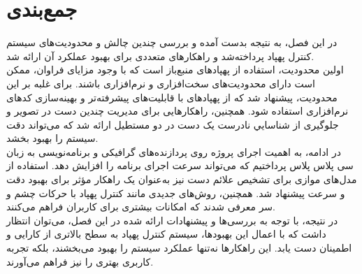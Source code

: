 \section{جمع‌بندی}
در این فصل، به نتیجه‌ بدست آمده و بررسی چندین چالش‌ و محدودیت‌های سیستم کنترل پهپاد پرداخته‌شد و راهکارهای متعددی برای بهبود عملکرد آن ارائه شد. 
\\
اولین محدودیت، استفاده از پهپادهای منبع‌باز است که با وجود مزایای فراوان، ممکن است دارای محدودیت‌های سخت‌افزاری و نرم‌افزاری باشند. برای غلبه بر این محدودیت، پیشنهاد شد که از پهپادهای با قابلیت‌های پیشرفته‌تر و 
بهینه‌سازی کدهای نرم‌افزاری استفاده شود. همچنین، راهکارهایی برای مدیریت چندین دست در تصویر و جلوگیری از شناسايي نادرست یک دست در دو مستطیل ارائه شد که می‌تواند دقت سیستم را بهبود بخشد.
\\
در ادامه، به اهمیت اجرای پروژه روی پردازنده‌های گرافیکی و برنامه‌نویسی به زبان سی پلاس پلاس پرداختیم که می‌تواند سرعت اجرای برنامه را افزایش دهد. استفاده از مدل‌های موازی برای تشخیص علائم دست نیز به‌عنوان یک راهکار مؤثر برای بهبود 
دقت و سرعت پیشنهاد شد. همچنین، روش‌های جدیدی مانند کنترل پهپاد با حرکات چشم و سر معرفی شدند که امکانات بیشتری برای کاربران فراهم می‌کنند.
\\
در نتیجه، با توجه به بررسی‌ها و پیشنهادات ارائه شده در این فصل، می‌توان انتظار داشت که با اعمال این بهبودها، سیستم کنترل پهپاد به سطح بالاتری از کارایی و اطمینان دست یابد. این راهکارها نه‌تنها عملکرد سیستم را بهبود می‌بخشند، بلکه تجربه کاربری بهتری را نیز فراهم می‌آورند.